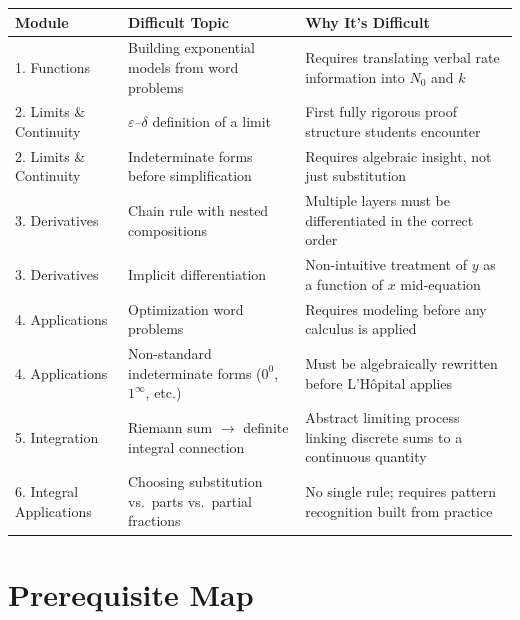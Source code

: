 \documentclass[11pt]{article}
\begin{document}
\begin{center}
\renewcommand{\arraystretch}{1.3}
\begin{longtable}{@{}p{4.3cm}p{4.6cm}p{5.3cm}@{}}
\toprule
\textbf{Module} & \textbf{Difficult Topic} & \textbf{Why It's Difficult} \\
\midrule
\endhead
1. Functions & Building exponential models from word problems & Requires translating verbal rate information into $N_0$ and $k$ \\
2. Limits \& Continuity & $\varepsilon$--$\delta$ definition of a limit & First fully rigorous proof structure students encounter \\
2. Limits \& Continuity & Indeterminate forms before simplification & Requires algebraic insight, not just substitution \\
3. Derivatives & Chain rule with nested compositions & Multiple layers must be differentiated in the correct order \\
3. Derivatives & Implicit differentiation & Non-intuitive treatment of $y$ as a function of $x$ mid-equation \\
4. Applications & Optimization word problems & Requires modeling before any calculus is applied \\
4. Applications & Non-standard indeterminate forms ($0^0$, $1^\infty$, etc.) & Must be algebraically rewritten before L'H\^{o}pital applies \\
5. Integration & Riemann sum $\to$ definite integral connection & Abstract limiting process linking discrete sums to a continuous quantity \\
6. Integral Applications & Choosing substitution vs.\ parts vs.\ partial fractions & No single rule; requires pattern recognition built from practice \\
\bottomrule
\end{longtable}
\end{center}

\section{Prerequisite Map}
\end{document}
